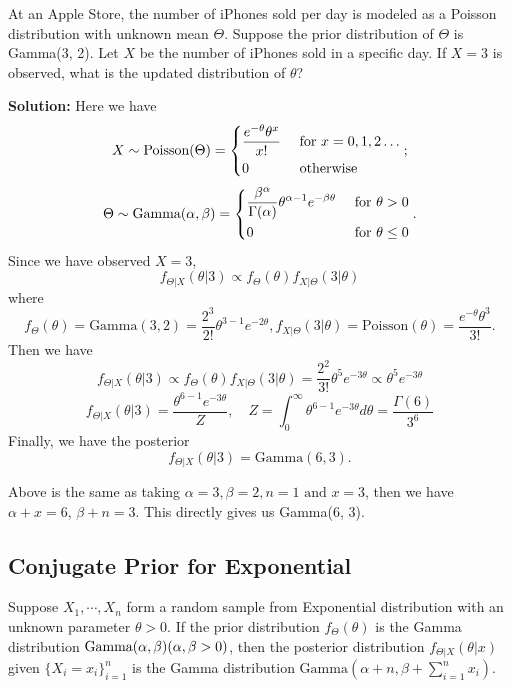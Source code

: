 \begin{eg}
  At an Apple Store, the number of iPhones sold per day is modeled as a Poisson distribution with unknown mean \(\Theta\). Suppose the prior distribution of \(\Theta\) is Gamma(3, 2). Let \(X\) be the number of iPhones sold in a specific day. If \(X = 3\) is observed, what is the updated distribution of \(\theta\)? 
  
  \textbf{Solution:} 
  Here we have 
  \[
    X \sim \text{Poisson}(\Theta) = \begin{dcases}
      \dfrac{e^{-\theta}\theta^x}{x!} &\text{ for } x = 0, 1, 2 \dots\\
      0  &\text{ otherwise} \\ 
    \end{dcases};
  \]
  \[
    \Theta \sim \text{Gamma}(\alpha, \beta) = \begin{dcases}
      \dfrac{\beta^{\alpha}}{\Gamma (\alpha)}\theta^{\alpha - 1} e^{-\beta\theta} &\text{ for } \theta > 0 \\
      0 &\text{ for } \theta \leq 0 \\
    \end{dcases}.
  \]
  Since we have observed \(X = 3\), 
  \[
    f_{\Theta \vert X} (\theta \vert 3) \propto f_{\Theta} (\theta) f_{X \vert \Theta} (3 \vert \theta)
  \]
  where
  \[
    f_{\Theta} (\theta) = \text{Gamma}(3, 2) = \dfrac{2^3}{2!}\theta^{3-1}e^{-2\theta}, f_{X \vert \Theta} (3 \vert \theta) = \text{Poisson}(\theta) = \dfrac{e^{-\theta}\theta^3}{3!}.
  \]
  Then we have
  \[
    f_{\Theta \vert X} (\theta \vert 3) \propto f_{\Theta} (\theta) f_{X \vert \Theta} (3 \vert \theta) = \dfrac{2^2}{3!} \theta^5 e^{-3\theta} \propto \theta^5 e^{-3\theta}
  \]
  \[
    f_{\Theta \vert X} (\theta \vert 3) = \dfrac{\theta^{6-1} e^{-3\theta}}{Z},\quad Z = \int_{0}^{\infty} \theta^{6-1} e^{-3\theta} d \theta = \dfrac{\Gamma(6)}{3^6}
  \]
  Finally, we have the posterior
  \[
    f_{\Theta \vert X} (\theta \vert 3) = \text{Gamma}(6, 3). 
  \]
\end{eg}

Above is the same as taking \(\alpha = 3, \beta = 2, n = 1 \text{ and } x = 3\), then we have \(\alpha + x = 6\), \(\beta + n = 3\). This directly gives us Gamma(6, 3). 

\subsection{Conjugate Prior for Exponential}
\begin{definition}
  Suppose \(X_1, \cdots, X_n\) form a random sample from Exponential distribution with an unknown parameter \(\theta > 0\). If the prior distribution \(f_{\Theta}(\theta)\) is the Gamma distribution \(\text{Gamma}(\alpha, \beta)\\ (\alpha, \beta > 0)\), then the posterior distribution \(f_{\Theta \vert X} (\theta \vert x)\) given \(\{X_i = x_i\}_{i=1} ^n\) is the Gamma distribution \(\text{Gamma}(\alpha + n, \beta + \sum_{i = 1}^n x_i)\). 
\end{definition}

